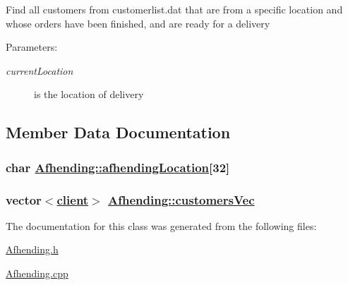Find all customers from customerlist.dat that are from a specific location and whose orders have been finished, and are ready for a delivery

\begin{Desc}
\item[Parameters:]
\begin{description}
\item[{\em current\-Location}]is the location of delivery \end{description}
\end{Desc}


\subsection{Member Data Documentation}
\hypertarget{class_afhending_85acd631eb078696afb9935bedeeb107}{
\subsubsection[afhendingLocation]{\setlength{\rightskip}{0pt plus 5cm}char \hyperlink{class_afhending_85acd631eb078696afb9935bedeeb107}{Afhending::afhending\-Location}\mbox{[}32\mbox{]}}}
\label{class_afhending_85acd631eb078696afb9935bedeeb107}


\hypertarget{class_afhending_52cc86469dd41b9be5b7186d6bd00589}{
\subsubsection[customersVec]{\setlength{\rightskip}{0pt plus 5cm}vector$<$\hyperlink{classclient}{client}$>$ \hyperlink{class_afhending_52cc86469dd41b9be5b7186d6bd00589}{Afhending::customers\-Vec}}}
\label{class_afhending_52cc86469dd41b9be5b7186d6bd00589}




The documentation for this class was generated from the following files:\begin{CompactItemize}
\item 
\hyperlink{_afhending_8h}{Afhending.h}\item 
\hyperlink{_afhending_8cpp}{Afhending.cpp}\end{CompactItemize}
